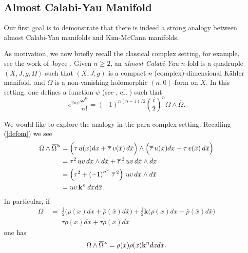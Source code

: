 \documentclass[12pt,letterpaper]{amsart}%
\numberwithin{mycounter}{section}
\theoremstyle{plain}
\numberwithin{equation}{section}
\theoremstyle{definition}
\begin{document}
\subsection{Almost Calabi-Yau Manifold}

Our first goal is to demonstrate that there is indeed a strong analogy between almost Calabi-Yau manifolds and Kim-McCann manifolds.  

As motivation, we now briefly recall the classical complex setting, for example, see the work of Joyce \cite[Section 8.4]{Joyce}. Given $n\geq2$, an \textit{almost Calabi-Yau} $n$-fold is a
quadruple $(X,J,g,\Omega)$ such that $(X,J,g)$ is a compact $n$
(complex)-dimensional K\"{a}hler manifold, and $\Omega$ is a non-vanishing
holomorphic $(n,0)$-form on $X.$
In this setting, one defines a function $\psi$ (see \cite[(15)]{behrndt2008}, cf. \cite[8.24]{Joyce}) such that
\begin{equation}
e^{2n\psi}\frac{\omega^{n}}{n!}=(-1)^{n(n-1)/2}\left(  \frac{i}{2}\right)
^{n}\Omega\wedge\overline{\Omega}. \label{CY}%
\end{equation}


We would like to explore the analogy in the para-complex setting.
Recalling (\ref{defom}) we see \begin{align*}
\Omega\wedge\overline{\Omega}^{_\textrm{\hspace{.03cm}\bf k}} &  =\Big( 
\tau\,u(x) dx +
\overline{\tau}\,v(\bar{x})\,d\bar{x}%
\Big)  \wedge \Big(
\overline{\tau}\,u(x)  dx +
\tau\,v(\bar{x})\,d\bar{x}%
\Big)  \\
&  =\tau^{2}\,uv\,dx\wedge d\bar{x}+\overline{\tau}^{\,2}\,uv\,d\bar{x}\wedge dx\\
&  =\left(\tau^{2}+\left(  -1\right)^{n^{2}}\,\overline{\tau}^{\,2}\right)\,uv\,dx\wedge d\bar{x}\\
& =uv\,\mathbf{k}^{n}\,dxd\bar{x}.
\end{align*}
In particular, if 
\begin{align}
    \Omega
        \;&=\;\frac{1}{2}\big( \rho(x)dx+\bar{\rho}(\bar{x})d\bar{x}\big)
        +\frac{1}{2}\mathbf{k}\big(  \rho(x)dx-\bar{\rho}(\bar{x})d\bar{x}\big) \label{def Omega} \\
        \;&=\; \tau\rho(x)dx+\overline{\tau} \bar{\rho}(\bar{x})d\bar{x} \label{def Omega w tau}
\end{align}
one has
\begin{equation}
\Omega\wedge\overline{\Omega}^{_\textrm{\hspace{.03cm}\bf k}}=\rho(x)\bar{\rho}(\bar{x})\mathbf{k}^{n}dxd\bar
{x}.\label{omega wedge itself}%
\end{equation}
\end{document}
